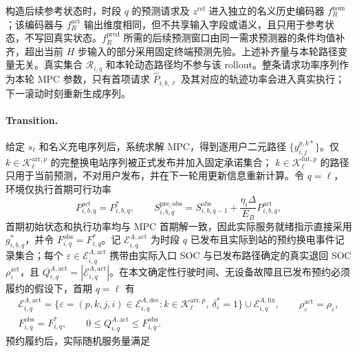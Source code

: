 \documentclass[12pt,a4paper,UTF8]{ctexart}
\begin{document}
构造后续参考状态时，时段 $q$ 的预测请求及 $z^{\mathrm{ref}}$ 进入独立的名义历史编码器 $f_R^{\mathrm{nom}}$；该编码器与 $f_R^{\mathrm{act}}$ 输出维度相同，但不共享输入字段或语义，且只用于参考状态，不写回真实状态。$f_R^{\mathrm{pred}}$ 所需的后续预测窗口由同一需求预测器的条件均值补齐，超出当前 $H$ 步输入的部分采用固定终端预测先验。上述补齐量与本轮路径变量无关。真实集合 $\mathcal R_{i,q}$ 和本轮动态路径均不参与该 rollout。整条请求功率序列作为本轮 MPC 参数，只有首项请求 $\widehat P_{i,b,\ell}$ 及其对应的轨迹功率会进入真实执行；下一滚动时刻重新生成序列。

\paragraph{Transition.}
给定 $s_\ell$ 和名义充电序列后，系统求解 MPC，得到逐用户二元路径
$\{y_{i,j}^{p,k*}\}$。仅
$k\in\mathcal K_\ell^{\mathrm{arr},p}$ 的完整换电站序列被正式发布并加入固定承诺集合；
$k\in\mathcal K_\ell^{\mathrm{fut},p}$ 的路径只用于当前预测，不对用户发布，并在下一轮用更新信息重新计算。令 $q=\ell$，环境仅执行首期可行功率
\begin{equation}
P_{i,b,q}^{\mathrm{act}}=P_{i,b,q}^{*},
\qquad
S_{i,b,q}^{\mathrm{pre,obs}}
=S_{i,b,q-1}^{\mathrm{obs}}
+\frac{\eta_i\Delta}{E_B}P_{i,b,q}^{\mathrm{act}},
\label{eq:actual_first_step_charging}
\end{equation}
首期初始状态和执行功率均与 MPC 首期解一致，因此实际服务就绪指示直接采用 $g_{i,b,q}^{*}$，并令 $F_{i,q}^{\mathrm{obs}}=F_{i,q}^{*}$。记 $\mathcal E_{i,q}^{A,\mathrm{act}}$ 为时段 $q$ 已发布且实际到站的预约换电事件记录集合；每个 $\varepsilon\in\mathcal E_{i,q}^{A,\mathrm{act}}$ 携带由实际入口 SOC 与已发布路径确定的真实退回 SOC $\rho_\varepsilon^{\mathrm{act}}$，且 $Q_{i,q}^{A,\mathrm{act}}=|\mathcal E_{i,q}^{A,\mathrm{act}}|$。在本文确定性行驶时间、无设备故障且已发布预约必须履约的假设下，首期 $q=\ell$ 有
\begin{equation}
\begin{gathered}
\mathcal E_{i,q}^{A,\mathrm{act}}
=\{\varepsilon=(p,k,j,i)\in
\mathcal E_{i,q}^{A,\mathrm{dec}}:
k\in\mathcal K_\ell^{\mathrm{arr},p},\ \delta_\varepsilon^*=1\}
\cup\mathcal E_{i,q}^{A,\mathrm{fix}},
\qquad
\rho_\varepsilon^{\mathrm{act}}=\rho_\varepsilon,\\
F_{i,q}^{\mathrm{obs}}=F_{i,q}^*,
\qquad
0\le Q_{i,q}^{A,\mathrm{act}}\le F_{i,q}^{\mathrm{obs}}.
\end{gathered}
\label{eq:actual_reservation_feasibility}
\end{equation}
预约履约后，实际随机服务量满足
\end{document}
